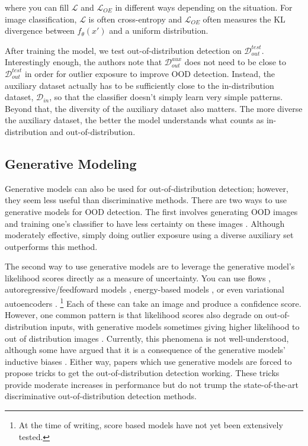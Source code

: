 \documentclass{article}
\newcommand{\D}{\mathcal{D}}
\newcommand{\loss}{\mathcal{L}}
\begin{document}
\noindent where you can fill $\loss$ and $\loss_{OE}$ in different ways depending on the situation. For image classification, $\loss$ is often cross-entropy and $\loss_{OE}$ often measures the KL divergence between $f_\theta(x')$ and a uniform distribution. 

After training the model, we test out-of-distribution detection on $\D_{out}^{test}$. Interestingly enough, the authors note that $\D_{out}^{aux}$ does not need to be close to $\D_{out}^{test}$ in order for outlier exposure to improve OOD detection. Instead, the auxiliary dataset actually has to be sufficiently close to the in-distribution dataset, $\D_{in}$, so that the classifier doesn’t simply learn very simple patterns. Beyond that, the diversity of the auxiliary dataset also matters. The more diverse the auxiliary dataset, the better the model understands what counts as in-distribution and out-of-distribution.

\subsection{Generative Modeling}

Generative models can also be used for out-of-distribution detection; however, they seem less useful than discriminative methods. There are two ways to use generative models for OOD detection. The first involves generating OOD images and training one’s classifier to have less certainty on these images \cite{lee2018training}. Although moderately effective, simply doing outlier exposure using a diverse auxiliary set outperforms this method.

The second way to use generative models are to leverage the generative model’s likelihood scores directly as a measure of uncertainty. You can use flows \cite{nalisnick2019deep, kirichenko2020normalizing}, autoregressive/feedfoward models \cite{nalisnick2019deep, chen2020generative}, energy-based models \cite{liu2021energybased}, or even variational autoencoders \cite{nalisnick2019deep, xiao2020likelihood}. \footnote{At the time of writing, score based models have not yet been extensively tested.} Each of these can take an image and produce a confidence score. However, one common pattern is that likelihood scores also degrade on out-of-distribution inputs, with generative models sometimes giving higher likelihood to out of distribution images \cite{nalisnick2019deep, choi2019waic, kirichenko2020normalizing}. Currently, this phenomena is not well-understood, although some have argued that it is a consequence of the generative models' inductive biases \cite{kirichenko2020normalizing}. Either way, papers which use generative models are forced to propose tricks to get the out-of-distribution detection working. These tricks provide moderate increases in performance but do not trump the state-of-the-art discriminative out-of-distribution detection methods. 
\end{document}
